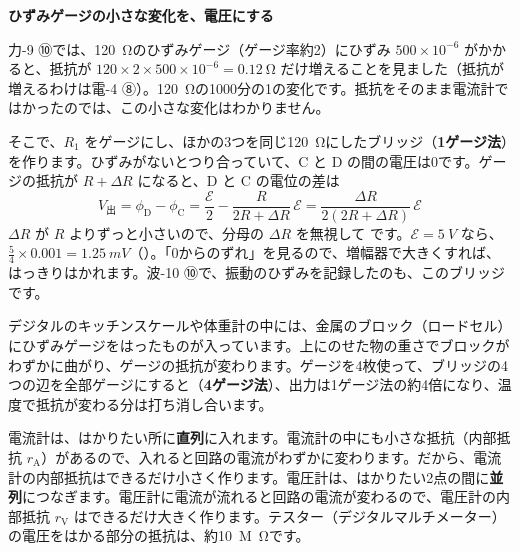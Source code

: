 \noindent\textbf{ひずみゲージの小さな変化を、電圧にする}\par\nobreak
力-9 ⑩では、\qty{120}{\ohm}のひずみゲージ（ゲージ率約2）にひずみ $500\times10^{-6}$ がかかると、抵抗が $120\times2\times500\times10^{-6}=\qty{0.12}{\ohm}$ だけ増えることを見ました（抵抗が増えるわけは電-4 ⑧）。\qty{120}{\ohm}の1000分の1の変化です。抵抗をそのまま電流計ではかったのでは、この小さな変化はわかりません。

そこで、$R_1$ をゲージにし、ほかの3つを同じ\qty{120}{\ohm}にしたブリッジ（\textbf{1ゲージ法}）を作ります。ひずみがないとつり合っていて、C と D の間の電圧は0です。ゲージの抵抗が $R+\Delta R$ になると、D と C の電位の差は
\[ V_{\text{出}}=\phi_{\mathrm D}-\phi_{\mathrm C}=\frac{\mathcal E}{2}-\frac{R}{2R+\Delta R}\,\mathcal E=\frac{\Delta R}{2(2R+\Delta R)}\,\mathcal E \]
$\Delta R$ が $R$ よりずっと小さいので、分母の $\Delta R$ を無視して
\label{ph:電-5:gauge}です。$\mathcal E=\qty{5}{V}$ なら、$\tfrac54\times0.001=\qty{1.25}{mV}$（）。「0からのずれ」を見るので、増幅器で大きくすれば、はっきりはかれます。波-10 ⑩で、振動のひずみを記録したのも、このブリッジです。

\begin{phmijika}[キッチンスケールと体重計]
デジタルのキッチンスケールや体重計の中には、金属のブロック（ロードセル）にひずみゲージをはったものが入っています。上にのせた物の重さでブロックがわずかに曲がり、ゲージの抵抗が変わります。ゲージを4枚使って、ブリッジの4つの辺を全部ゲージにすると（\textbf{4ゲージ法}）、出力は1ゲージ法の約4倍になり、温度で抵抗が変わる分は打ち消し合います。
\end{phmijika}


\leavevmode\label{ph:電-5:sec8}電流計は、はかりたい所に\textbf{直列}に入れます。電流計の中にも小さな抵抗（内部抵抗 $r_{\mathrm A}$）があるので、入れると回路の電流がわずかに変わります。だから、電流計の内部抵抗はできるだけ小さく作ります。電圧計は、はかりたい2点の間に\textbf{並列}につなぎます。電圧計に電流が流れると回路の電流が変わるので、電圧計の内部抵抗 $r_{\mathrm V}$ はできるだけ大きく作ります。テスター（デジタルマルチメーター）の電圧をはかる部分の抵抗は、約\qty{10}{M\ohm}です。

